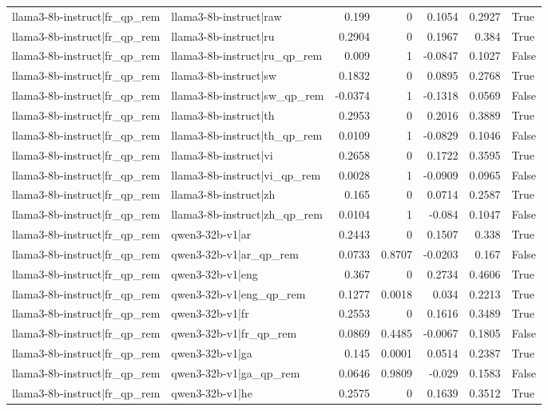 \begin{table}
\begin{tabular}{l l r r r r l}
llama3-8b-instruct|fr_qp_rem & llama3-8b-instruct|raw & 0.199 & 0 & 0.1054 & 0.2927 & True \\
llama3-8b-instruct|fr_qp_rem & llama3-8b-instruct|ru & 0.2904 & 0 & 0.1967 & 0.384 & True \\
llama3-8b-instruct|fr_qp_rem & llama3-8b-instruct|ru_qp_rem & 0.009 & 1 & -0.0847 & 0.1027 & False \\
llama3-8b-instruct|fr_qp_rem & llama3-8b-instruct|sw & 0.1832 & 0 & 0.0895 & 0.2768 & True \\
llama3-8b-instruct|fr_qp_rem & llama3-8b-instruct|sw_qp_rem & -0.0374 & 1 & -0.1318 & 0.0569 & False \\
llama3-8b-instruct|fr_qp_rem & llama3-8b-instruct|th & 0.2953 & 0 & 0.2016 & 0.3889 & True \\
llama3-8b-instruct|fr_qp_rem & llama3-8b-instruct|th_qp_rem & 0.0109 & 1 & -0.0829 & 0.1046 & False \\
llama3-8b-instruct|fr_qp_rem & llama3-8b-instruct|vi & 0.2658 & 0 & 0.1722 & 0.3595 & True \\
llama3-8b-instruct|fr_qp_rem & llama3-8b-instruct|vi_qp_rem & 0.0028 & 1 & -0.0909 & 0.0965 & False \\
llama3-8b-instruct|fr_qp_rem & llama3-8b-instruct|zh & 0.165 & 0 & 0.0714 & 0.2587 & True \\
llama3-8b-instruct|fr_qp_rem & llama3-8b-instruct|zh_qp_rem & 0.0104 & 1 & -0.084 & 0.1047 & False \\
llama3-8b-instruct|fr_qp_rem & qwen3-32b-v1|ar & 0.2443 & 0 & 0.1507 & 0.338 & True \\
llama3-8b-instruct|fr_qp_rem & qwen3-32b-v1|ar_qp_rem & 0.0733 & 0.8707 & -0.0203 & 0.167 & False \\
llama3-8b-instruct|fr_qp_rem & qwen3-32b-v1|eng & 0.367 & 0 & 0.2734 & 0.4606 & True \\
llama3-8b-instruct|fr_qp_rem & qwen3-32b-v1|eng_qp_rem & 0.1277 & 0.0018 & 0.034 & 0.2213 & True \\
llama3-8b-instruct|fr_qp_rem & qwen3-32b-v1|fr & 0.2553 & 0 & 0.1616 & 0.3489 & True \\
llama3-8b-instruct|fr_qp_rem & qwen3-32b-v1|fr_qp_rem & 0.0869 & 0.4485 & -0.0067 & 0.1805 & False \\
llama3-8b-instruct|fr_qp_rem & qwen3-32b-v1|ga & 0.145 & 0.0001 & 0.0514 & 0.2387 & True \\
llama3-8b-instruct|fr_qp_rem & qwen3-32b-v1|ga_qp_rem & 0.0646 & 0.9809 & -0.029 & 0.1583 & False \\
llama3-8b-instruct|fr_qp_rem & qwen3-32b-v1|he & 0.2575 & 0 & 0.1639 & 0.3512 & True \\

\end{tabular}
\end{table}
